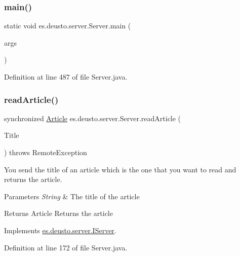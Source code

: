 \subsubsection{\texorpdfstring{main()}{main()}}
{\footnotesize\ttfamily static void es.\+deusto.\+server.\+Server.\+main (\begin{DoxyParamCaption}\item[{String \mbox{[}$\,$\mbox{]}}]{args }\end{DoxyParamCaption})\hspace{0.3cm}{\ttfamily [static]}}



Definition at line 487 of file Server.\+java.

\mbox{\label{classes_1_1deusto_1_1server_1_1_server_ac3af6f09e37d0b86743f8f46e39acdad}} 
\subsubsection{\texorpdfstring{read\+Article()}{readArticle()}}
{\footnotesize\ttfamily synchronized \hyperlink{classes_1_1deusto_1_1server_1_1jdo_1_1_article}{Article} es.\+deusto.\+server.\+Server.\+read\+Article (\begin{DoxyParamCaption}\item[{String}]{Title }\end{DoxyParamCaption}) throws Remote\+Exception}

You send the title of an article which is the one that you want to read and returns the article. 
\begin{DoxyParams}{Parameters}
{\em String} & The title of the article \\
\hline
\end{DoxyParams}
\begin{DoxyReturn}{Returns}
Article Returns the article 
\end{DoxyReturn}


Implements \hyperlink{interfacees_1_1deusto_1_1server_1_1_i_server_a1f02a5aa0628909b5464141923f5d1d2}{es.\+deusto.\+server.\+I\+Server}.



Definition at line 172 of file Server.\+java.

\mbox{\label{classes_1_1deusto_1_1server_1_1_server_a0ab63e5bc49a52ff84f7d6859161b683}} 
